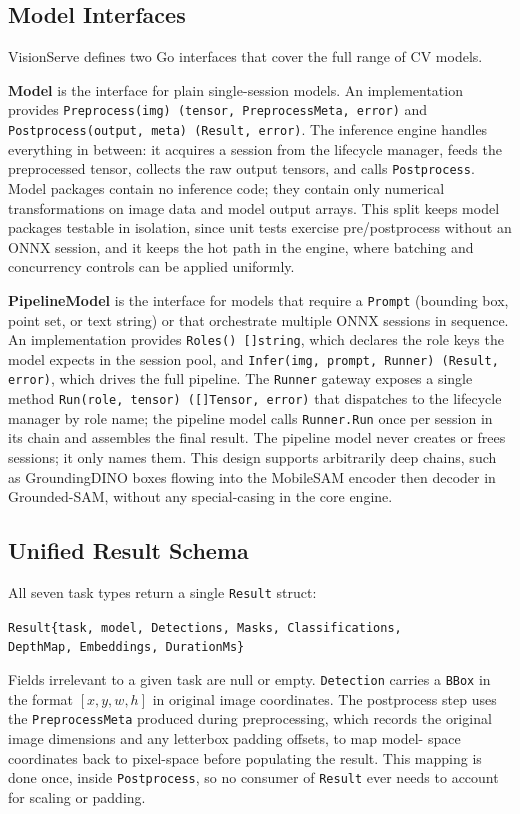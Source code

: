 \subsection{Model Interfaces}
\label{sec:design:interfaces}

VisionServe defines two Go interfaces that cover the full range of CV models.

\textbf{Model} is the interface for plain single-session models.
An implementation provides \texttt{Preprocess(img) (tensor, PreprocessMeta,
error)} and \texttt{Postprocess(output, meta) (Result, error)}.
The inference engine handles everything in between: it acquires a session
from the lifecycle manager, feeds the preprocessed tensor, collects the raw
output tensors, and calls \texttt{Postprocess}.
Model packages contain no inference code; they contain only numerical
transformations on image data and model output arrays.
This split keeps model packages testable in isolation, since unit tests exercise
pre/postprocess without an ONNX session, and it keeps the hot path in the
engine, where batching and concurrency controls can be applied uniformly.

\textbf{PipelineModel} is the interface for models that require a
\texttt{Prompt} (bounding box, point set, or text string) or that orchestrate
multiple ONNX sessions in sequence.
An implementation provides \texttt{Roles() []string}, which declares the role
keys the model expects in the session pool, and \texttt{Infer(img, prompt,
Runner) (Result, error)}, which drives the full pipeline.
The \texttt{Runner} gateway exposes a single method \texttt{Run(role, tensor)
([]Tensor, error)} that dispatches to the lifecycle manager by role name;
the pipeline model calls \texttt{Runner.Run} once per session in its chain and
assembles the final result.
The pipeline model never creates or frees sessions; it only
names them.
This design supports arbitrarily deep chains, such as GroundingDINO boxes flowing
into the MobileSAM encoder then decoder in Grounded-SAM, without any
special-casing in the core engine.

\subsection{Unified Result Schema}
\label{sec:design:result}

All seven task types return a single \texttt{Result} struct:
\begin{center}
\small
\texttt{Result\{task, model, Detections, Masks, Classifications,}\\
\texttt{DepthMap, Embeddings, DurationMs\}}
\end{center}
Fields irrelevant to a given task are null or empty.
\texttt{Detection} carries a \texttt{BBox} in the format \([x, y, w, h]\) in
original image coordinates. The postprocess step uses the
\texttt{PreprocessMeta} produced during preprocessing, which records the
original image dimensions and any letterbox padding offsets, to map model-
space coordinates back to pixel-space before populating the result.
This mapping is done once, inside \texttt{Postprocess}, so no consumer of
\texttt{Result} ever needs to account for scaling or padding.

